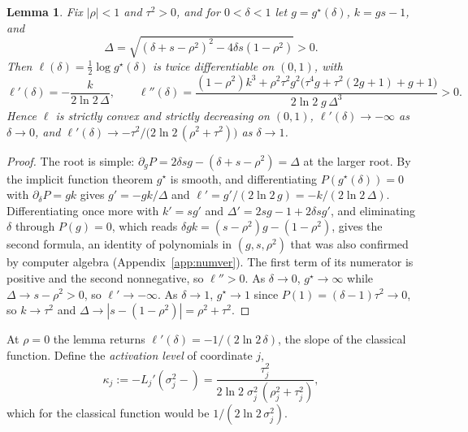 \documentclass[11pt,onecolumn]{IEEEtran}
\newtheorem{lemma}[theorem]{Lemma}
\begin{document}
\begin{lemma}\label{lem:slope}
Fix $|\rho|<1$ and $\tau^2>0$, and for $0<\delta<1$ let $g=g^\star(\delta)$,
$k=gs-1$, and
\[
\Delta=\sqrt{(\delta+s-\rho^2)^2-4\delta s(1-\rho^2)}>0.
\]
Then
$\ell(\delta)=\tfrac12\log g^\star(\delta)$ is twice differentiable on
$(0,1)$, with
\begin{equation}
\ell'(\delta)=-\frac{k}{2\ln2\,\Delta},
\qquad
\ell''(\delta)=\frac{(1-\rho^2)k^3
+\rho^2\tau^2g^2\bigl(\tau^4g+\tau^2(2g+1)+g+1\bigr)}{2\ln2\;g\,\Delta^3}>0 .
\label{eq:slope}
\end{equation}
Hence $\ell$ is strictly convex and strictly decreasing on $(0,1)$,
$\ell'(\delta)\to-\infty$ as $\delta\to0$, and
$\ell'(\delta)\to-\tau^2/\bigl(2\ln2\,(\rho^2+\tau^2)\bigr)$ as
$\delta\to1$.
\end{lemma}

\begin{proof}
The root is simple: $\partial_gP=2\delta sg-(\delta+s-\rho^2)=\Delta$ at
the larger root. By the implicit function theorem $g^\star$ is smooth, and
differentiating $P(g^\star(\delta))=0$ with $\partial_\delta P=gk$ gives
$g'=-gk/\Delta$ and $\ell'=g'/(2\ln2\,g)=-k/(2\ln2\,\Delta)$.
Differentiating once more with $k'=sg'$ and $\Delta'=2sg-1+2\delta sg'$,
and eliminating $\delta$ through $P(g)=0$, which reads
$\delta gk=(s-\rho^2)g-(1-\rho^2)$, gives the second formula, an identity
of polynomials in $(g,s,\rho^2)$ that was also confirmed by computer
algebra (Appendix~\ref{app:numver}). The first term of its numerator is
positive and the second nonnegative, so $\ell''>0$. As $\delta\to0$,
$g^\star\to\infty$ while $\Delta\to s-\rho^2>0$, so $\ell'\to-\infty$. As
$\delta\to1$, $g^\star\to1$ since $P(1)=(\delta-1)\tau^2\to0$, so
$k\to\tau^2$ and $\Delta\to|s-(1-\rho^2)|=\rho^2+\tau^2$.
\end{proof}

At $\rho=0$ the lemma returns $\ell'(\delta)=-1/(2\ln2\,\delta)$, the
slope of the classical function. Define the \emph{activation level} of
coordinate $j$,
\begin{equation}
\kappa_j:=-L_j'(\sigma_j^2-)
=\frac{\tau_j^2}{2\ln2\;\sigma_j^2\,(\rho_j^2+\tau_j^2)},
\label{eq:kappa}
\end{equation}
which for the classical function would be $1/(2\ln2\,\sigma_j^2)$.
\end{document}

